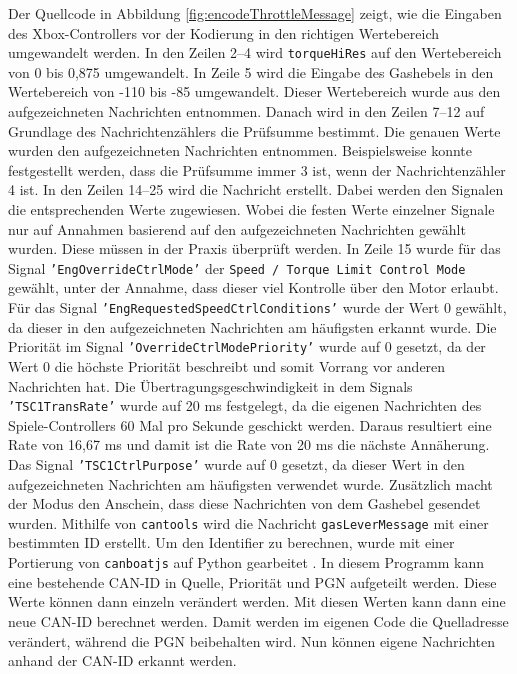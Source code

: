 Der Quellcode in Abbildung \ref{fig:encodeThrottleMessage} zeigt, wie die Eingaben des Xbox-Controllers vor der Kodierung in den 
richtigen Wertebereich umgewandelt werden.
In den Zeilen 2--4 wird \texttt{torqueHiRes} auf den Wertebereich von 0 bis 0,875 umgewandelt.
In Zeile 5 wird die Eingabe des Gashebels in den Wertebereich von -110 bis -85 umgewandelt.
Dieser Wertebereich wurde aus den aufgezeichneten Nachrichten entnommen.
Danach wird in den Zeilen 7--12 auf Grundlage des Nachrichtenzählers die Prüfsumme bestimmt. Die genauen Werte wurden 
den aufgezeichneten Nachrichten entnommen. Beispielsweise konnte festgestellt werden, dass die Prüfsumme
immer 3 ist, wenn der Nachrichtenzähler 4 ist. 
In den Zeilen 14--25 wird die Nachricht erstellt. Dabei werden den Signalen die entsprechenden
Werte zugewiesen. Wobei die festen Werte einzelner Signale nur auf Annahmen basierend auf den aufgezeichneten Nachrichten gewählt wurden.
Diese müssen in der Praxis überprüft werden. In Zeile 15 wurde für das Signal \texttt{'EngOverrideCtrlMode'} der 
\texttt{Speed / Torque Limit Control Mode} gewählt, unter der Annahme, dass dieser viel Kontrolle über den Motor erlaubt.
Für das Signal \texttt{'EngRequestedSpeedCtrlConditions'} wurde der Wert 0 gewählt, da dieser in den aufgezeichneten Nachrichten
am häufigsten erkannt wurde. Die Priorität im Signal \texttt{'OverrideCtrlModePriority'} wurde auf 0 gesetzt, da der Wert 0 die 
höchste Priorität beschreibt und somit Vorrang vor anderen Nachrichten hat. Die Übertragungsgeschwindigkeit 
in dem Signals \texttt{'TSC1TransRate'} wurde auf 20 ms festgelegt, da die eigenen Nachrichten des Spiele-Controllers
60 Mal pro Sekunde geschickt werden. Daraus resultiert eine Rate von 16,67 ms und damit ist die Rate von 20 ms die nächste
Annäherung. Das Signal \texttt{'TSC1CtrlPurpose'} wurde auf 0 gesetzt, da dieser Wert in den aufgezeichneten Nachrichten
am häufigsten verwendet wurde. Zusätzlich macht der Modus den Anschein, dass diese Nachrichten von dem Gashebel gesendet wurden. 
Mithilfe von \texttt{cantools} wird die Nachricht \texttt{gasLeverMessage} mit einer bestimmten ID erstellt. 
Um den Identifier zu berechnen, wurde mit einer Portierung von \texttt{canboatjs} auf Python gearbeitet 
\cite{canboatjs}. 
In diesem Programm kann eine bestehende CAN-ID in Quelle, Priorität und PGN aufgeteilt werden. Diese Werte können dann
einzeln verändert werden. Mit diesen Werten kann dann eine neue CAN-ID berechnet werden. 
Damit werden im eigenen Code die Quelladresse verändert, während die PGN beibehalten wird.
Nun können eigene Nachrichten 
anhand der CAN-ID erkannt werden.
